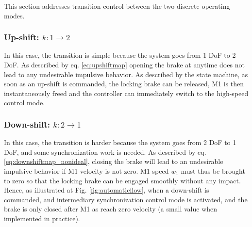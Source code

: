 This section addresses transition control between the two discrete operating modes.


\subsubsection{Up-shift: $k:1\rightarrow2$}
In this case, the transition is simple because the system goes from 1 DoF to 2 DoF. As described by eq. \eqref{eq:upshiftmap} opening the brake at anytime does not lead to any undesirable impulsive behavior. As described by the state machine, as soon as an up-shift is commanded, the locking brake can be released, M1 is then instantaneously freed and the controller can immediately switch to the high-speed control mode.
%

\subsubsection{Down-shift: $k:2\rightarrow1$}
In this case, the transition is harder because the system goes from 2 DoF to 1 DoF, and some synchronization work is needed. As described by eq. \eqref{eq:downshiftmap_nonideal}, closing the brake will lead to an undesirable impulsive behavior if M1 velocity is not zero. M1 speed $w_1$ must thus be brought to zero so that the locking brake can be engaged smoothly without any impact. Hence, as illustrated at Fig. \ref{fig:automaticflow}, when a down-shift is commanded, and intermediary synchronization control mode is activated, and the brake is only closed after M1 as reach zero velocity (a small value when implemented in practice). %

